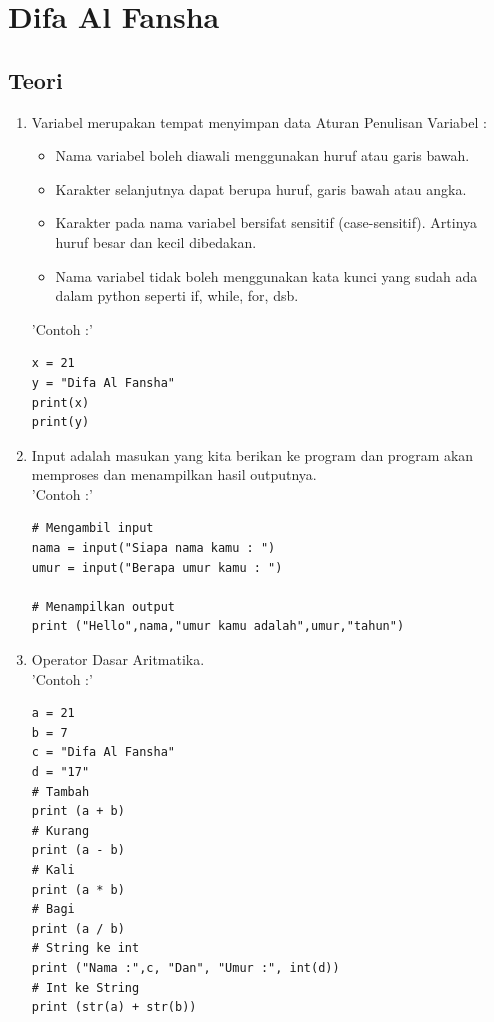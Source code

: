 \section{Difa Al Fansha}
\subsection{Teori}

\begin{enumerate}
\item Variabel merupakan tempat menyimpan data
Aturan Penulisan Variabel :
\begin{itemize}
\item Nama variabel boleh diawali menggunakan huruf atau garis bawah.
\item Karakter selanjutnya dapat berupa huruf, garis bawah atau angka.
\item Karakter pada nama variabel bersifat sensitif (case-sensitif). Artinya huruf besar dan kecil dibedakan. 
\item Nama variabel tidak boleh menggunakan kata kunci yang sudah ada dalam python seperti if, while, for, dsb.
\end{itemize}
'Contoh :'
\begin{verbatim}
x = 21
y = "Difa Al Fansha"
print(x)
print(y)
\end{verbatim}

\item Input adalah masukan yang kita berikan ke program dan program akan memproses dan menampilkan hasil outputnya.\\
'Contoh :'
\begin{verbatim}
# Mengambil input
nama = input("Siapa nama kamu : ")
umur = input("Berapa umur kamu : ")

# Menampilkan output
print ("Hello",nama,"umur kamu adalah",umur,"tahun")
\end{verbatim}

\item Operator Dasar Aritmatika.\\
'Contoh :'
\begin{verbatim}
a = 21
b = 7
c = "Difa Al Fansha"
d = "17"
# Tambah
print (a + b)
# Kurang
print (a - b)
# Kali
print (a * b)
# Bagi
print (a / b)
# String ke int
print ("Nama :",c, "Dan", "Umur :", int(d))
# Int ke String
print (str(a) + str(b))
\end{verbatim}


\end{enumerate}
